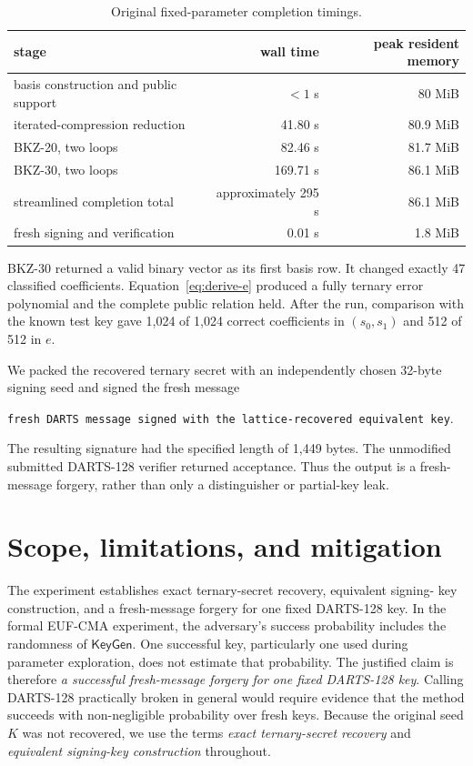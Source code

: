 \documentclass[11pt,a4paper]{article}
\newcommand{\KeyGen}{\mathsf{KeyGen}}
\begin{document}
\begin{table}[ht]
\centering
\caption{Original fixed-parameter completion timings.}
\label{tab:completion}
\begin{tabular}{lrr}
\toprule
stage & wall time & peak resident memory\\
\midrule
basis construction and public support & $<1$ s & 80 MiB\\
iterated-compression reduction & 41.80 s & 80.9 MiB\\
BKZ-20, two loops & 82.46 s & 81.7 MiB\\
BKZ-30, two loops & 169.71 s & 86.1 MiB\\
\midrule
streamlined completion total & approximately 295 s & 86.1 MiB\\
fresh signing and verification & 0.01 s & 1.8 MiB\\
\bottomrule
\end{tabular}
\end{table}

BKZ-30 returned a valid binary vector as its first basis row.  It changed
exactly 47 classified coefficients.  Equation~\eqref{eq:derive-e} produced a
fully ternary error polynomial and the complete public relation held.  After
the run, comparison with the known test key gave 1,024 of 1,024 correct
coefficients in $(s_0,s_1)$ and 512 of 512 in $e$.

We packed the recovered ternary secret with an independently chosen 32-byte
signing seed
and signed the fresh message
\begin{center}
\small\texttt{fresh DARTS message signed with the lattice-recovered equivalent key}.
\end{center}
The resulting signature had the specified length of 1,449 bytes.  The
unmodified submitted DARTS-128 verifier returned acceptance.  Thus the output
is a fresh-message forgery, rather than only a distinguisher or partial-key
leak.

\section{Scope, limitations, and mitigation}
\label{sec:scope}

The experiment establishes exact ternary-secret recovery, equivalent signing-
key construction, and a fresh-message forgery for one fixed DARTS-128 key.
In the formal EUF-CMA experiment, the adversary's success probability includes
the randomness of $\KeyGen$.  One successful key, particularly one used during
parameter exploration, does not estimate that probability.  The justified
claim is therefore \emph{a successful fresh-message forgery for one fixed
DARTS-128 key}.  Calling DARTS-128 practically broken in general would require
evidence that the method succeeds with non-negligible probability over fresh
keys.  Because the original seed $K$ was not recovered, we use the terms
\emph{exact ternary-secret recovery} and \emph{equivalent signing-key
construction} throughout.
\end{document}
